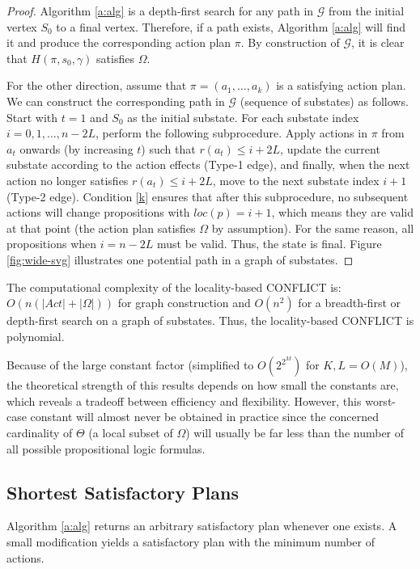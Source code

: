 \documentclass[a4paper,fleqn]{cas-dc}
\begin{document}
\begin{proof}{}
Algorithm \ref{a:alg} is a depth-first search for any path in $\mathcal{G}$ from the initial vertex $S_0$ to a final vertex. Therefore, if a path exists, Algorithm \ref{a:alg} will find it and produce the corresponding action plan $\pi$. By construction of $\mathcal{G}$, it is clear that $H(\pi, s_0, \gamma)$ satisfies $\Omega$.

For the other direction, assume that $\pi=(a_1,\dots,a_k)$ is a satisfying action plan. 
We can construct the corresponding path in $\mathcal{G}$ (sequence of substates) as follows.
Start with $t=1$ and $S_0$ as the initial substate. For each substate index $i=0,1,\dots,n-2L$, 
perform the following subprocedure. 
Apply actions in $\pi$ from $a_t$ onwards (by increasing $t$) such that $r(a_t)\le i + 2L$,
update the current substate according to the action effects (Type-1 edge), and finally, when the next action no longer satisfies $r(a_t)\le i+2L$, move to the next substate index $i+1$ (Type-2 edge).
Condition \eqref{k} ensures that after this subprocedure, no subsequent actions will change propositions
with $loc(p)=i+1$, which means they are valid at that point (the action plan satisfies $\Omega$ by assumption).
For the same reason, all propositions when $i=n-2L$ must be valid. Thus, the state is final. Figure \ref{fig:wide-svg} illustrates one potential path in a graph of substates.
\end{proof}

The computational complexity of the locality-based CONFLICT is: $O(n(|Act|+|\Omega|))$ for graph construction and $O(n^2)$ for a breadth-first or depth-first search on a graph of substates. Thus, the locality-based CONFLICT is polynomial.

Because of the large constant factor (simplified to $O(2^{2^M})$ for $K,L=O(M)$), the theoretical strength of this results depends on how small the constants are, which reveals a tradeoff between efficiency and flexibility.  However, this worst-case constant will almost never be obtained in practice since the concerned cardinality of $\Theta$ (a local subset of $\Omega$) will usually be far less than the number of all possible propositional logic formulas.

\subsection{Shortest Satisfactory Plans}\label{sp}

Algorithm \ref{a:alg} returns an arbitrary satisfactory plan whenever one exists.
A small modification yields a satisfactory plan with the minimum number of actions.
\end{document}
